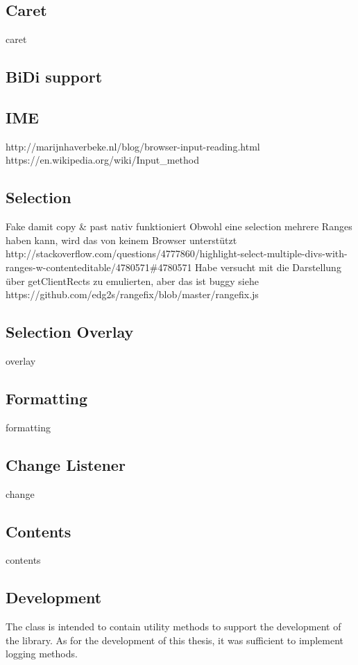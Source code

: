
\subsection{Caret}
caret
\subsection{BiDi support}
\subsection{IME} 
http://marijnhaverbeke.nl/blog/browser-input-reading.html 
https://en.wikipedia.org/wiki/Input\_method


\subsection{Selection}
Fake damit copy \& past nativ funktioniert
Obwohl eine selection mehrere Ranges haben kann, wird das von keinem Browser unterstützt http://stackoverflow.com/questions/4777860/highlight-select-multiple-divs-with-ranges-w-contenteditable/4780571\#4780571
Habe versucht mit die Darstellung über getClientRects zu emulierten, aber das ist buggy siehe https://github.com/edg2s/rangefix/blob/master/rangefix.js


\subsection{Selection Overlay}
overlay

\subsection{Formatting}
formatting

\subsection{Change Listener}
change

\subsection{Contents}
contents

\subsection{Development}

The  class is intended to contain utility methods to support the development of the library. As for the development of this thesis, it was sufficient to implement logging methods.

